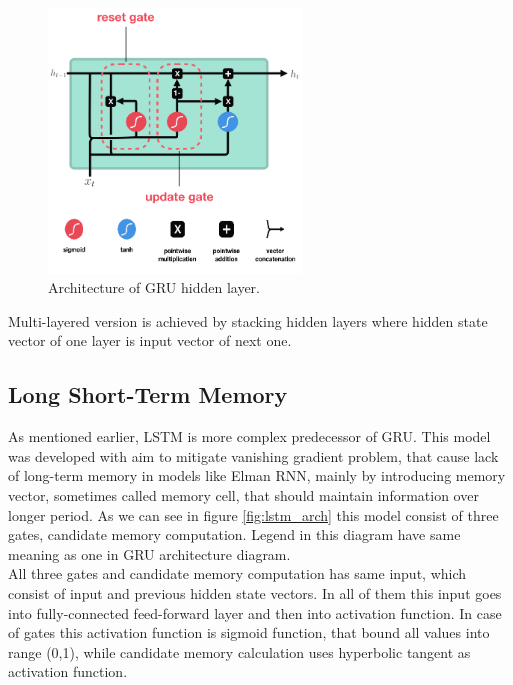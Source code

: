 \begin{figure}[!h]
	\centering
	
	\includegraphics[width=0.6\textwidth]{images/GRU_arch.png}
	
	\caption{Architecture of GRU hidden layer.}
	\label{fig:gru_arch}
\end{figure}
 
Multi-layered version is achieved by stacking hidden layers where hidden state vector of one layer is input vector of next one.
 
\subsection{Long Short-Term Memory}

As mentioned earlier, LSTM is more complex predecessor of GRU. This model was developed with aim to mitigate vanishing gradient problem, that cause lack of long-term memory in models like Elman RNN, mainly by introducing memory vector, sometimes called memory cell, that should maintain information over longer period. As we can see in figure \ref{fig:lstm_arch} this model consist of three gates, candidate memory computation. Legend in this diagram have same meaning as one in GRU architecture diagram.
\\

All three gates and candidate memory computation has same input, which consist of input and previous hidden state vectors. In all of them this input goes into fully-connected feed-forward layer and then into activation function. In case of gates this activation function is sigmoid function, that bound all values into range (0,1), while candidate memory calculation uses hyperbolic tangent as activation function.
\\ 

